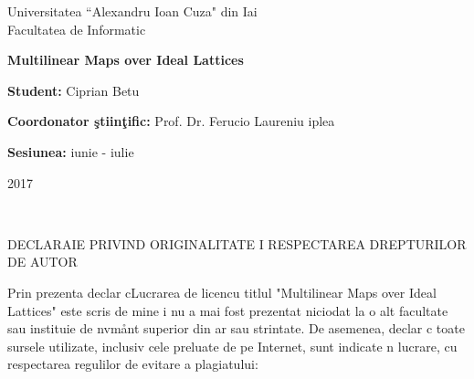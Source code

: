 \begin{titlepage}
	
	\begin{center}
		Universitatea ``Alexandru Ioan Cuza" din Ia\sh i\\
		Facultatea de Informatic\ua\\
	\end{center}
	
	\vspace{80mm}
	
	\begin{center}
		\begin{Huge}
			\textbf{Multilinear Maps over Ideal Lattices}
		\end{Huge}
	\end{center}
	
	\vspace{60mm}
	
	\textbf{Student:} Ciprian B\ua etu
	
	\textbf{Coordonator ştiinţific:} Prof. Dr. Ferucio Lauren\tz iu \Tz iplea
	
	\vfill
	
	\begin{center}
		\textbf{Sesiunea:} iunie - iulie
		
		2017
	\end{center}
	
\end{titlepage}
\newpage

\


\vspace{10mm}
\begin{large}
	\begin{center}
		DECLARA\Tz IE PRIVIND ORIGINALITATE \Sh I RESPECTAREA DREPTURILOR DE AUTOR
	\end{center}
\end{large}

\vspace{20mm}

Prin prezenta declar c\ua \space Lucrarea de licen\tz \ua \space cu titlul "Multilinear Maps over Ideal Lattices" este scris{\ua} de mine \sh i nu a mai fost prezentat{\ua}  niciodat{\ua} la o alt{\ua} facultate sau institu\tz ie de \ii nv\ua \tz \ua m\aa nt superior din \tz ar{\ua} sau str\ua in\ua tate. De asemenea, declar c{\ua} toate sursele utilizate, inclusiv cele preluate de pe Internet, sunt indicate \ii n lucrare, cu respectarea regulilor de evitare a plagiatului:

